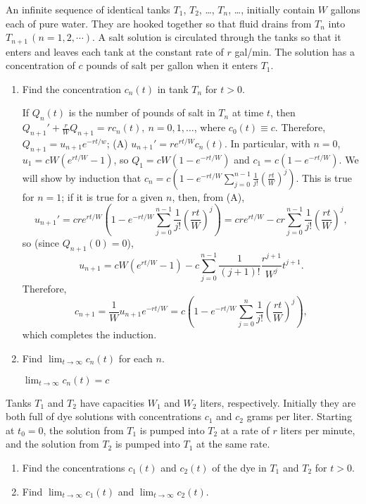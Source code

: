 \documentclass{ximera}
\begin{document}
\begin{problem}\label{exer:4.2.20}
An infinite sequence of identical tanks $T_1$, $T_2$, \dots, $T_n$, \dots,
initially contain $W$ gallons
each of pure water.  They are hooked together so that fluid drains
from $T_n$ into  $T_{n+1}\,(n=1,2,\cdots)$.
A salt solution is circulated through the tanks so that it enters and
leaves each tank at the constant rate of $r$ gal/min.
The solution has a concentration of
$c$  pounds of salt per
gallon when it enters $T_1$.

\begin{enumerate}
\item %
Find the concentration $c_n(t)$
in tank $T_n$ for $t>0$.

\begin{solution}
If $Q_n(t)$ is the number of pounds of salt in $T_n$ at time $t$, then
$Q_{n+1}'+\frac{r}{W}Q_{n+1}=rc_n(t),\ n=0,1,\dots$, where
$c_0(t)\equiv c$. Therefore,$Q_{n+1}=u_{n+1}e^{-rt/w}$;
(A) $u_{n+1}'=re^{rt/W}c_n(t)$. In particular, with $n=0$,
$u_1=cW(e^{rt/W}-1)$, so $Q_1=cW(1-e^{-rt/W})$  and
$c_1=c(1-e^{-rt/W})$. We will show by induction that
$c_n=c\left(1-e^{-rt/W}\sum_{j=0}^{n-1}\frac{1}{j!}\left(\frac{rt}{W}\right)^j\right)$.
 This is true for $n=1$; if it is
true for a given $n$, then, from (A),
$$
u_{n+1}'=cre^{rt/W}
\left(1-e^{-rt/W}\sum_{j=0}^{n-1}\frac{1}{j!}\left(\frac{rt}{W}\right)^j\right)
=cre^{rt/W}-cr
\sum_{j=0}^{n-1}\frac{1}{j!}\left(\frac{rt}{W}\right)^j,
$$
so (since $Q_{n+1}(0)=0$),
$$
u_{n+1}=cW(e^{rt/W}-1)-c\sum_{j=0}^{n-1}\frac{1}{(j+1)!}
\frac{r^{j+1}}{W^j}t^{j+1}.
$$
Therefore,
$$
c_{n+1}=\frac{1}{W}u_{n+1}e^{-rt/W}=
c\left(1-e^{-rt/W}\sum_{j=0}^n\frac{1}{j!}\left(\frac{rt}{W}\right)^j\right),
$$
which completes the induction.
\end{solution}

\item %
  Find $\lim_{t\to\infty}c_n(t)$ for each $n$.

\begin{solution}
$\lim_{t\to\infty}c_n(t)=c$
\end{solution}
\end{enumerate}
\end{problem}

\begin{problem}\label{exer:4.2.21}
Tanks $T_1$  and $T_2$ have capacities $W_1$ and $W_2$ liters,
respectively.
Initially they are both full of dye solutions with concentrations $c_{1}$
and $c_2$ grams per liter. Starting at $t_0=0$,  the solution from $T_1$
is pumped into $T_2$ at a rate of $r$  liters per minute,
and the solution from $T_2$
is pumped into $T_1$ at the same rate.

\begin{enumerate}
\item %
Find the concentrations $c_1(t)$ and $c_2(t)$ of the dye in $T_1$
and $T_2$ for $t>0$.
\item %
Find $\lim_{t\to\infty}c_1(t)$  and $\lim_{t\to\infty}c_2(t)$.
\end{enumerate}
\end{problem}
\end{document}
